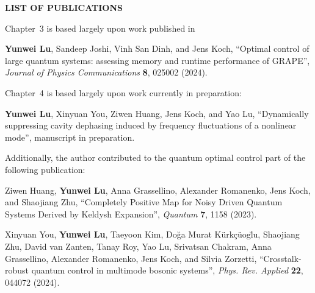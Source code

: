 \clearpage
\begin{centering}
\textbf{LIST OF PUBLICATIONS}\\
\vspace{\baselineskip}
\end{centering}

\noindent Chapter~3 is based largely upon work published in
\begin{list}{}{\leftmargin=1.5cm \rightmargin=0cm}
  \item[] \textbf{Yunwei Lu}, Sandeep Joshi, Vinh San Dinh, and Jens Koch, ``Optimal control of large quantum systems: assessing memory and runtime performance of GRAPE'', \emph{Journal of Physics Communications} \textbf{8}, 025002 (2024).
\end{list}

\noindent Chapter~4 is based largely upon work currently in preparation:
\begin{list}{}{\leftmargin=1.5cm \rightmargin=0cm}
  \item[] \textbf{Yunwei Lu}, Xinyuan You, Ziwen Huang, Jens Koch, and Yao Lu, ``Dynamically suppressing cavity dephasing induced by frequency fluctuations of a nonlinear mode'', manuscript in preparation.
\end{list}

\noindent Additionally, the author contributed to the quantum optimal control part of the following publication:
\begin{list}{}{\leftmargin=1.5cm \rightmargin=0cm}
  \item[] Ziwen Huang, \textbf{Yunwei Lu}, Anna Grassellino, Alexander Romanenko, Jens Koch, and Shaojiang Zhu, ``Completely Positive Map for Noisy Driven Quantum Systems Derived by Keldysh Expansion'', \emph{Quantum} \textbf{7}, 1158 (2023).
\end{list}

\begin{list}{}{\leftmargin=1.5cm \rightmargin=0cm}
  \item[] Xinyuan You, \textbf{Yunwei Lu}, Taeyoon Kim, Do\u{g}a Murat K\"urk\c{c}\"uog\u{l}u, Shaojiang Zhu, David van Zanten, Tanay Roy, Yao Lu, Srivatsan Chakram, Anna Grassellino, Alexander Romanenko, Jens Koch, and Silvia Zorzetti, ``Crosstalk-robust quantum control in multimode bosonic systems'', \emph{Phys. Rev. Applied} \textbf{22}, 044072 (2024).
\end{list}

\clearpage